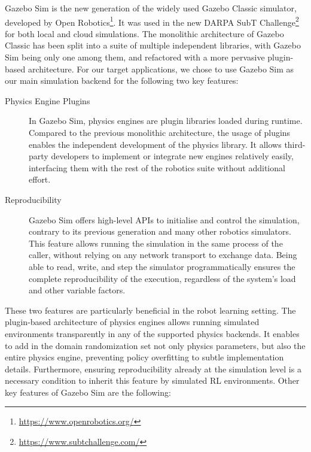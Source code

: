 Gazebo Sim is the new generation of the widely used Gazebo Classic simulator, developed by Open Robotics\footnote{\url{https://www.openrobotics.org/}}.
It was used in the new DARPA SubT Challenge\footnote{\url{https://www.subtchallenge.com/}} for both local and cloud simulations.
The monolithic architecture of Gazebo Classic has been split into a suite of multiple independent libraries, with Gazebo Sim being only one among them, and refactored with a more pervasive plugin-based architecture.
For our target applications, we chose to use Gazebo Sim as our main simulation backend for the following two key features:
%
\begin{description}
%
\item[Physics Engine Plugins]
In Gazebo Sim, physics engines are plugin libraries loaded during runtime.
Compared to the previous monolithic architecture, the usage of plugins enables the independent development of the physics library.
It allows third-party developers to implement or integrate new engines relatively easily, interfacing them with the rest of the robotics suite without additional effort.
%
\item[Reproducibility]
Gazebo Sim offers high-level \cpp \acp{API} to initialise and control the simulation, contrary to its previous generation and many other robotics simulators.
This feature allows running the simulation in the same process of the caller, without relying on any network transport to exchange data.
Being able to read, write, and step the simulator programmatically ensures the complete reproducibility of the execution, regardless of the system's load and other variable factors.
%
\end{description}
%
These two features are particularly beneficial in the robot learning setting.
The plugin-based architecture of physics engines allows running simulated environments transparently in any of the supported physics backends.
It enables to add in the domain randomization set not only physics parameters, but also the entire physics engine, preventing policy overfitting to subtle implementation details.
Furthermore, ensuring reproducibility already at the simulation level is a necessary condition to inherit this feature by simulated \ac{RL} environments.
%
Other key features of Gazebo Sim are the following:
%
